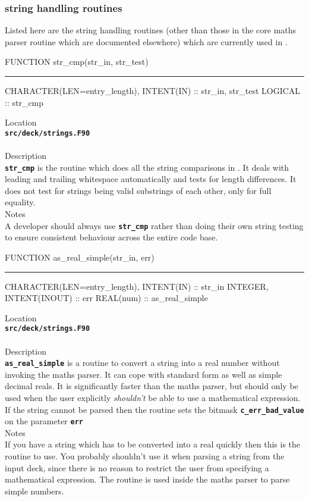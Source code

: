 \documentclass[12pt,a4paper]{article}
\newcommand{\HRule}{\rule[0.3cm]{\linewidth}{0.5mm}}
\newcommand{\inlinecode}[1]{{\color{warwickred} \bf\texttt{#1}}}
\newcommand{\EPOCH}{{\color{warwickdark}\fontfamily{phv}\selectfont{EPOCH}}}
\begin{document}
\subsubsection{{\EPOCH} string handling routines}

Listed here are the string handling routines (other than those in the core
maths parser routine which are documented elsewhere) which are currently used
in {\EPOCH}.

\pagebreak
\begin{codedef}
FUNCTION str_cmp(str_in, str_test)
\HRule
CHARACTER(LEN=entry_length), INTENT(IN) :: str_in, str_test
LOGICAL :: str_cmp
\end{codedef}
\vspace{1cm}
{\Large Location\\}
\inlinecode{src/deck/strings.F90}\\
\\[0.5cm]
{\Large Description\\}
\inlinecode{str\_cmp} is the routine which does all the string comparisons in
{\EPOCH}. It deals with leading and trailing whitespace automatically and
tests for length differences. It does not test for strings being
valid substrings of each other, only for full equality.
\\[0.5cm]
{\Large Notes\\}
A developer should always use \inlinecode{str\_cmp} rather than doing their own
string testing to ensure consistent behaviour across the entire {\EPOCH} code
base.

\pagebreak
\begin{codedef}
FUNCTION as_real_simple(str_in, err)
\HRule
CHARACTER(LEN=entry_length), INTENT(IN) :: str_in
INTEGER, INTENT(INOUT) :: err
REAL(num) :: as_real_simple
\end{codedef}
\vspace{1cm}
{\Large Location\\}
\inlinecode{src/deck/strings.F90}\\
\\[0.5cm]
{\Large Description\\}
\inlinecode{as\_real\_simple} is a routine to convert a string into a real
number without invoking the maths parser. It can cope with standard form as
well as simple decimal reals. It is significantly faster than the maths parser,
but should only be used when the user explicitly {\it shouldn't} be able to use
a mathematical expression. If the string cannot be parsed then the routine sets
the bitmask \inlinecode{c\_err\_bad\_value} on the parameter \inlinecode{err}
\\[0.5cm]
{\Large Notes\\}
If you have a string which has to be converted into a real quickly then this is
the routine to use. You probably shouldn't use it when parsing a string from
the input deck, since there is no reason to restrict the user from specifying a
mathematical expression. The routine is used inside the maths parser to parse
simple numbers.
\end{document}
